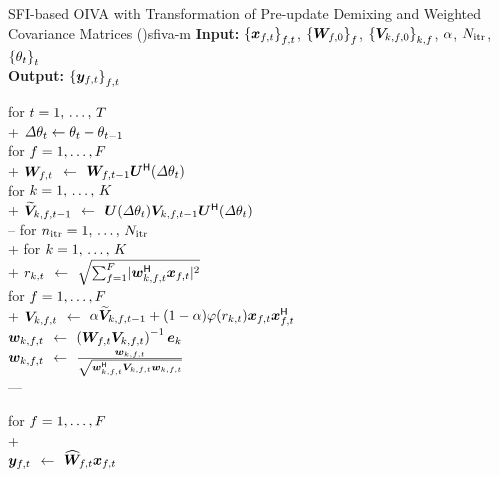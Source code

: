 \documentclass[sip,biber]{now-journal}
\begin{document}
\begin{algorithm}{SFI-based OIVA with Transformation of Pre-update Demixing and Weighted Covariance Matrices (\SFIIVAm)}{sfiva-m}
  \textbf{Input:} ${\{\Obs _{\ft}\}} _{\ft}$, ${\{\bm{W} _{f,0}\}} _{f}$, ${\{\bm{V} _{k,f,0}\}} _{k,f}$, $\alpha$, $N _{\mathrm{itr}}$, ${\{\theta _{t}\}} _{t}$ \\
  \textbf{Output:} ${\{\Est _{\ft}\}} _{\ft}$
  \begin{pseudo}
    for $t = 1,\, \dots,\, T$ \\+
      $\varDelta \theta _{t} \gets \theta _{t} - \theta _{t - 1}$ \\
      for $f = 1, \dots, F$ \\+
        {$\bm{W} _{f,t}$} $\gets$ $\bm{W} _{f,t - 1} \bm{U} ^{\mathsf{H}} (\varDelta\theta _{t})$ \ct{\eqref{eq:sfiiva:demix}} \\
        for $k = 1,\, \dots,\, K$ \\+
          {$\refpos{\cov} _{\src,\ft[-1]}$} $\gets$ $\rotMat (\varDelta\rotSpat _{\tframe}) \cov _{\src,\ft[-1]} \rotMat ^{\hermite} (\varDelta \rotSpat _{\tframe})$ \ct{\eqref{eq:sfiiva:cov}} \\--
      for $n _{\mathrm{itr}} = 1,\, \dots,\, N _{\mathrm{itr}}$ \\+
        for $k = 1,\, \dots,\, K$ \\+
          {$r _{k,t}$} $\gets$ $\sqrt{\sum _{\freq = 1} ^{\Freq} \abs{\demix _{\src,\ft} ^{\hermite} \Obs _{\ft}} ^2}$ \ct{\eqref{eq:var}} \\
          for $f = 1, \dots, F$ \\+
            {$\cov _{\src,\ft}    $} $\gets$ $\forget \refpos{\cov} _{\src,\ft[-1]} + (1 - \forget) \weight(\var _{\src,\tframe}) \Obs _{\ft} \Obs _{\ft} ^{\hermite}$ \\
            {$\demix _{\src,\ft}$} $\gets$ $\left(\Demix _{\ft} \cov _{\src,\ft}\right) ^{-1} \eye _{\src}$ \ct{\eqref{eq:ip:proj}} \\
            {$\demix _{\src,\ft}$} $\gets$ $\frac{\demix _{\src,\ft}}{\sqrt{\demix _{\src,\ft} ^{\hermite} \cov _{\src,\ft} \demix _{\src,\ft}}}$ \ct{\eqref{eq:ip:norm}} \\---

      for $f = 1, \dots, F$ \\+
         \ct{\eqref{eq:pb:w}}\\
        {$\Est _{\ft}$} $\gets$ $\proj{\Demix }_{\ft} \Obs _{\ft}$ \ct{\eqref{eq:pb:y}}
  \end{pseudo}
\end{algorithm}
\end{document}
